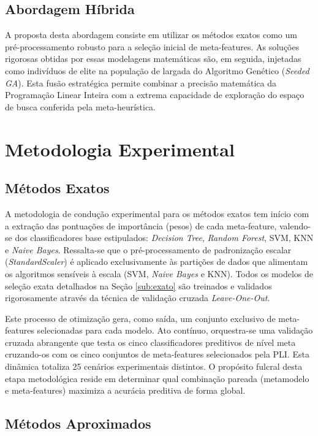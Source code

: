 \documentclass[12pt]{article}
\begin{document}
\subsection{Abordagem Híbrida}

A proposta desta abordagem consiste em utilizar os métodos exatos como um pré-processamento robusto para a seleção inicial de meta-features. As soluções rigorosas obtidas por essas modelagens matemáticas são, em seguida, injetadas como indivíduos de elite na população de largada do Algoritmo Genético (\textit{Seeded GA}). Esta fusão estratégica permite combinar a precisão matemática da Programação Linear Inteira com a extrema capacidade de exploração do espaço de busca conferida pela meta-heurística.

\section{Metodologia Experimental}

\subsection{Métodos Exatos}

A metodologia de condução experimental para os métodos exatos tem início com a extração das pontuações de importância (pesos) de cada meta-feature, valendo-se dos classificadores base estipulados: \textit{Decision Tree}, \textit{Random Forest}, SVM, KNN e \textit{Naive Bayes}. Ressalta-se que o pré-processamento de padronização escalar (\textit{StandardScaler}) é aplicado exclusivamente às partições de dados que alimentam os algoritmos sensíveis à escala (SVM, \textit{Naive Bayes} e KNN). Todos os modelos de seleção exata detalhados na Seção \ref{sub:exato} são treinados e validados rigorosamente através da técnica de validação cruzada \textit{Leave-One-Out}. 

Este processo de otimização gera, como saída, um conjunto exclusivo de meta-features selecionadas para cada modelo. Ato contínuo, orquestra-se uma validação cruzada abrangente que testa os cinco classificadores preditivos de nível meta cruzando-os com os cinco conjuntos de meta-features selecionados pela PLI. Esta dinâmica totaliza 25 cenários experimentais distintos. O propósito fulcral desta etapa metodológica reside em determinar qual combinação pareada (metamodelo e meta-features) maximiza a acurácia preditiva de forma global.

\subsection{Métodos Aproximados}
\end{document}
